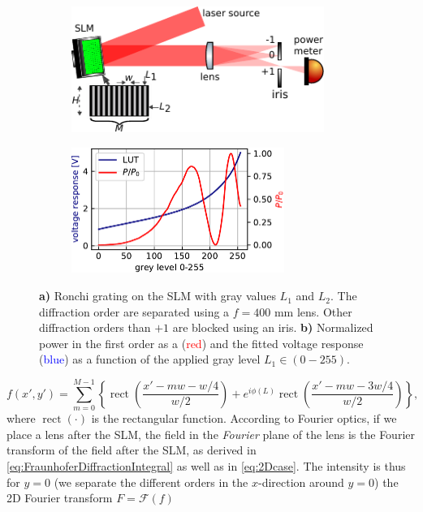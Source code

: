 \begin{figure}
	\begin{subfigure}{.54\linewidth}
		\flushleft
		\includegraphics[height=4.1cm]{figures/LUTcalibrationSetup.pdf}
		\caption{}
		\label{fig:LUTCalibrationSetup}
	\end{subfigure}
	\hfill
	\begin{subfigure}{.45\linewidth}
		\flushright
		\includegraphics[height=4.1cm]{figures/LUTplot.pdf}
		\caption{}
		\label{fig:LUTcalibration}
	\end{subfigure}
	\caption{\textbf{a)} Ronchi grating on the SLM with gray values $L_1$ and $L_2$. 
	The diffraction order are separated using a $f=400$ mm lens. 
	Other diffraction orders than $+1$ are blocked using an iris. 
	\textbf{b)} Normalized power in the first order as a (\textcolor{red}{red}) and the fitted voltage response (\textcolor{blue}{blue}) as a function of the applied gray level $L_1 \in (0-255)$.}
\end{figure}

\begin{equation}\label{eq:FieldAfterSLM}
    f(x',y') = \sum_{m=0}^{M-1} \left\{
    \operatorname{rect}\left(\frac{x'-m w - w/4}{w/2}\right) + e^{i \phi(L)} \operatorname{rect}\left(\frac{x'- m w - 3 w/4}{w/2}\right)
    \right\},
\end{equation}
where $\operatorname{rect}(\cdot)$ is the rectangular function. 
According to Fourier optics, if we place a lens after the SLM, the field in the \textit{Fourier} plane of the lens is the Fourier transform of the field after the SLM, as derived in \cref{eq:FraunhoferDiffractionIntegral} as well as in \cref{eq:2Dcase}.
The intensity is thus for $y=0$ (we separate the different orders in the $x$-direction around $y=0$) the 2D Fourier transform $F = \mathcal{F}(f)$ \cite{Zhang1994}

